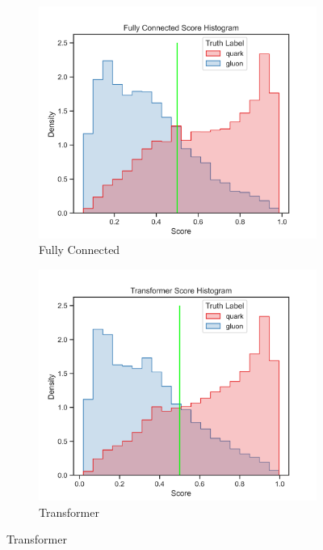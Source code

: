 \begin{figure}[!htb]
	\centering
	\begin{subfigure}[t]{0.49\textwidth}
		\includegraphics[width=1\textwidth]{src/plots/results/score/fc.png}
		\caption{Fully Connected}
		\label{fig:app_score_fc}
	\end{subfigure}
	\begin{subfigure}[t]{0.49\textwidth}
		\includegraphics[width=1\textwidth]{src/plots/results/score/transformer.png}
		\caption{Transformer}
		\label{fig:app_score_transformer}

\end{subfigure}
\end{figure}
